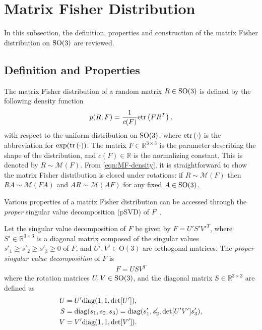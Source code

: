 \section{Matrix Fisher Distribution} \label{section:MF-MF}

In this subsection, the definition, properties and construction of the matrix Fisher distribution on $\mathrm{SO}(3)$ are reviewed.

\subsection{Definition and Properties}

The matrix Fisher distribution of a random matrix $R\in\mathrm{SO}(3)$ is defined by the following density function
\begin{equation} \label{eqn:MF-density}
	p(R;F) = \frac{1}{c(F)}\mathrm{etr}\left( FR^T \right),
\end{equation}
with respect to the uniform distribution on $\mathrm{SO}(3)$, where $\mathrm{etr}\left( \cdot \right)$ is the abbreviation for $\exp(\mathrm{tr}\left( \cdot \right))$.
The matrix $F\in\mathbb{R}^{3\times 3}$ is the parameter describing the shape of the distribution, and $c(F)\in\mathbb{R}$ is the normalizing constant.
This is denoted by $R\sim\mathcal{M}(F)$.
From \eqref{eqn:MF-density}, it is straightforward to show the matrix Fisher distribution is closed under rotations: if $R\sim\mathcal{M}(F)$ then $RA \sim \mathcal{M}(FA)$ and $AR \sim \mathcal{M}(AF)$ for any fixed $A\in\mathrm{SO}(3)$. 

Various properties of a matrix Fisher distribution can be accessed through the \textit{proper} singular value decomposition (pSVD) of $F$~\cite{khatri1977mises,lee2018bayesian,markley1988attitude}.

\begin{definition} \label{def:psvd}
	Let the singular value decomposition of $F$ be given by $F= U'S' V'^T$, where $S'\in\mathbb{R}^{3\times3}$ is a diagonal matrix composed of the singular values $ s'_1\geq s'_2\geq s'_3\geq 0$ of $F$, and $U',V'\in\mathrm{O}(3)$ are orthogonal matrices.
	The \textit{proper singular value decomposition} of $F$ is 
	\begin{align}
		F=USV^T
	\end{align}
	where the rotation matrices $U,V\in\mathrm{SO}(3)$, and the diagonal matrix $S\in\mathbb{R}^{3\times 3}$ are defined as
	\begin{align}
		U &= U'\mathrm{diag}(1,1,\det[U']), \nonumber \\
		S &= \mathrm{diag}(s_1,s_2,s_3)=\mathrm{diag}(s'_1,s'_2,\det[U'V']s'_3), \nonumber \\
		V &= V'\mathrm{diag}(1,1,\det[V']).
	\end{align}
\end{definition}

